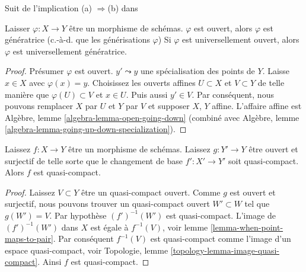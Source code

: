 \begin{lemma}

\label{lemma-open-generizing}

\begin{reference}

Suit de l'implication (a) $\Rightarrow$(b) dans \cite[IV, Corollary 1.10.4]{EGA}\end{reference}

Laisser $\varphi : X \to Y$ être un morphisme de schémas. $\varphi$ est ouvert, alors $\varphi$ est génératrice (c.-à-d. que les générisations $\varphi$) Si $\varphi$ est universellement ouvert, alors $\varphi$ est universellement génératrice.

\end{lemma}

\begin{proof}

Présumer $\varphi$ est ouvert. $y' \leadsto y$ une spécialisation des points de $Y$. Laisse $x \in X$ avec $\varphi(x) = y$. Choisissez les ouverts affines $U \subset X$ et $V \subset Y$ de telle manière que
$\varphi(U) \subset V$ et $x \in U$. Puis aussi $y' \in V$. Par conséquent, nous pouvons remplacer $X$ par $U$ et $Y$ par $V$ et supposer $X$, $Y$ affine. L'affaire affine est Algèbre, lemme \ref{algebra-lemma-open-going-down}
(combiné avec Algèbre, lemme \ref{algebra-lemma-going-up-down-specialization}).

\end{proof}

\begin{lemma}

\label{lemma-descent-quasi-compact}
Laissez $f : X \to Y$ être un morphisme de schémas. Laissez $g : Y' \to Y$ être ouvert et surjectif de telle sorte que le changement de base $f' : X' \to Y'$ soit quasi-compact. Alors $f$ est quasi-compact.
\end{lemma}

\begin{proof}
Laissez $V \subset Y$ être un quasi-compact ouvert. Comme $g$ est ouvert et surjectif, nous pouvons trouver un quasi-compact ouvert $W' \subset W$ tel que $g(W') = V$. Par hypothèse $(f')^{-1}(W')$ est quasi-compact. L'image de $(f')^{-1}(W')$ dans $X$ est égale à $f^{-1}(V)$, voir lemme \ref{lemma-when-point-maps-to-pair}. Par conséquent $f^{-1}(V)$ est quasi-compact comme l'image d'un espace quasi-compact, voir Topologie, lemme \ref{topology-lemma-image-quasi-compact}. Ainsi $f$ est quasi-compact.
\end{proof}





